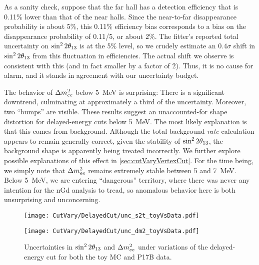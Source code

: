 \documentclass[../thesis.tex]{subfiles}
\begin{document}
As a sanity check, suppose that the far hall has a detection efficiency that is 0.11\% lower than that of the near halls. Since the near-to-far disappearance probability is about 5\%, this 0.11\% efficiency bias corresponds to a bias on the disappearance probability of 0.11/5, or about 2\%. The fitter's reported total uncertainty on $\sin^2 2\theta_{13}$ is at the 5\% level, so we crudely estimate an $0.4\sigma$ shift in $\sin^2 2\theta_{13}$ from this fluctuation in efficiencies. The actual shift we observe is consistent with this (and in fact smaller by a factor of 2). Thus, it is no cause for alarm, and it stands in agreement with our uncertainty budget.
% 

The behavior of $\Delta m^2_{ee}$ below 5~MeV is surprising: There is a significant downtrend, culminating at approximately a third of the uncertainty. Moreover, two ``bumps'' are visible. These results suggest an unaccounted-for shape distortion for delayed-energy cuts below 5~MeV. The most likely explanation is that this comes from background. Although the total background \emph{rate} calculation appears to remain generally correct, given the stability of $\sin^2 2\theta_{13}$, the background shape is apparently being treated incorrectly. We further explore possible explanations of this effect in \autoref{sec:cutVaryVertexCut}. For the time being, we simply note that $\Delta m^2_{ee}$ remains extremely stable between 5 and 7~MeV. Below 5~MeV, we are entering ``dangerous'' territory, where there was never any intention for the nGd analysis to tread, so anomalous behavior here is both unsurprising and unconcerning.

\begin{figure}[ht]
  \begin{minipage}{0.5\linewidth}%
    \texttt{[image: CutVary/DelayedCut/unc\_s2t\_toyVsData.pdf]}%
  \end{minipage}%
  \begin{minipage}{0.5\linewidth}%
    \texttt{[image: CutVary/DelayedCut/unc\_dm2\_toyVsData.pdf]}%
  \end{minipage}%
  \caption{Uncertainties in $\sin^2 2\theta_{13}$ and $\Delta m^2_{ee}$ under variations of the delayed-energy cut for both the toy MC and P17B data.}
  \label{fig:cutVaryDelCutFitUnc}
\end{figure}
\end{document}
